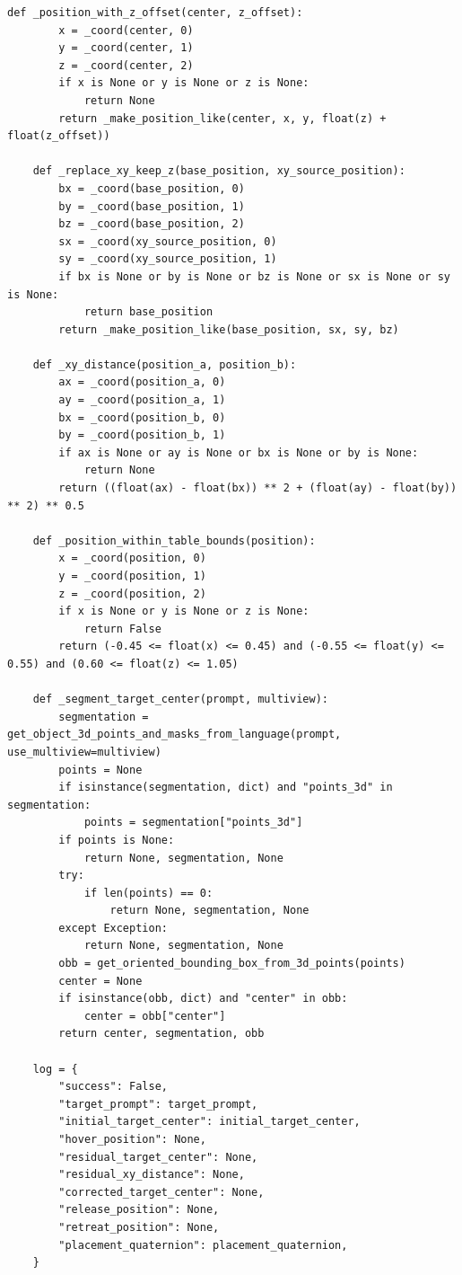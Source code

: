 \begin{lstlisting}[style=ratsappendixpython]
    def _position_with_z_offset(center, z_offset):
        x = _coord(center, 0)
        y = _coord(center, 1)
        z = _coord(center, 2)
        if x is None or y is None or z is None:
            return None
        return _make_position_like(center, x, y, float(z) + float(z_offset))

    def _replace_xy_keep_z(base_position, xy_source_position):
        bx = _coord(base_position, 0)
        by = _coord(base_position, 1)
        bz = _coord(base_position, 2)
        sx = _coord(xy_source_position, 0)
        sy = _coord(xy_source_position, 1)
        if bx is None or by is None or bz is None or sx is None or sy is None:
            return base_position
        return _make_position_like(base_position, sx, sy, bz)

    def _xy_distance(position_a, position_b):
        ax = _coord(position_a, 0)
        ay = _coord(position_a, 1)
        bx = _coord(position_b, 0)
        by = _coord(position_b, 1)
        if ax is None or ay is None or bx is None or by is None:
            return None
        return ((float(ax) - float(bx)) ** 2 + (float(ay) - float(by)) ** 2) ** 0.5

    def _position_within_table_bounds(position):
        x = _coord(position, 0)
        y = _coord(position, 1)
        z = _coord(position, 2)
        if x is None or y is None or z is None:
            return False
        return (-0.45 <= float(x) <= 0.45) and (-0.55 <= float(y) <= 0.55) and (0.60 <= float(z) <= 1.05)

    def _segment_target_center(prompt, multiview):
        segmentation = get_object_3d_points_and_masks_from_language(prompt, use_multiview=multiview)
        points = None
        if isinstance(segmentation, dict) and "points_3d" in segmentation:
            points = segmentation["points_3d"]
        if points is None:
            return None, segmentation, None
        try:
            if len(points) == 0:
                return None, segmentation, None
        except Exception:
            return None, segmentation, None
        obb = get_oriented_bounding_box_from_3d_points(points)
        center = None
        if isinstance(obb, dict) and "center" in obb:
            center = obb["center"]
        return center, segmentation, obb

    log = {
        "success": False,
        "target_prompt": target_prompt,
        "initial_target_center": initial_target_center,
        "hover_position": None,
        "residual_target_center": None,
        "residual_xy_distance": None,
        "corrected_target_center": None,
        "release_position": None,
        "retreat_position": None,
        "placement_quaternion": placement_quaternion,
    }


\end{lstlisting}
